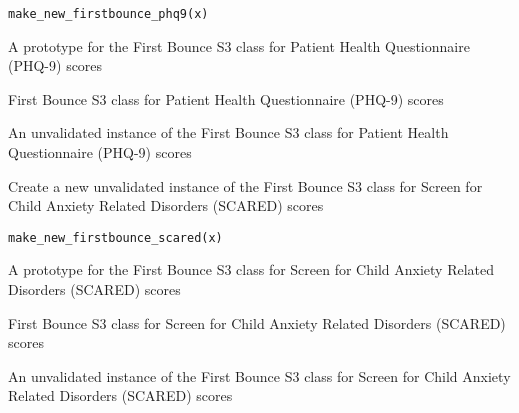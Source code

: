 \documentclass[a4paper]{book}
\begin{document}
%
\begin{Usage}
\begin{verbatim}
make_new_firstbounce_phq9(x)
\end{verbatim}
\end{Usage}
%
\begin{Arguments}
\begin{ldescription}
\item[\code{x}] A prototype for the First Bounce S3 class for Patient Health Questionnaire (PHQ-9) scores
\end{ldescription}
\end{Arguments}
%
\begin{Details}\relax
First Bounce S3 class for Patient Health Questionnaire (PHQ-9) scores
\end{Details}
%
\begin{Value}
An unvalidated instance of the First Bounce S3 class for Patient Health Questionnaire (PHQ-9) scores
\end{Value}
%
\begin{Description}\relax
Create a new unvalidated instance of the First Bounce S3 class for Screen for Child Anxiety Related Disorders (SCARED) scores
\end{Description}
%
\begin{Usage}
\begin{verbatim}
make_new_firstbounce_scared(x)
\end{verbatim}
\end{Usage}
%
\begin{Arguments}
\begin{ldescription}
\item[\code{x}] A prototype for the First Bounce S3 class for Screen for Child Anxiety Related Disorders (SCARED) scores
\end{ldescription}
\end{Arguments}
%
\begin{Details}\relax
First Bounce S3 class for Screen for Child Anxiety Related Disorders (SCARED) scores
\end{Details}
%
\begin{Value}
An unvalidated instance of the First Bounce S3 class for Screen for Child Anxiety Related Disorders (SCARED) scores
\end{Value}
\end{document}
